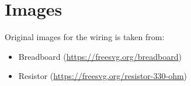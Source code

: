 \documentclass[11pt,a4paper]{article}
\begin{document}




    



\section*{Images}
Original images for the wiring is taken from:
\begin{itemize}
    \item Breadboard (\url{https://freesvg.org/breadboard})
    \item Resistor (\url{https://freesvg.org/resistor-330-ohm})
\end{itemize}
\end{document}
